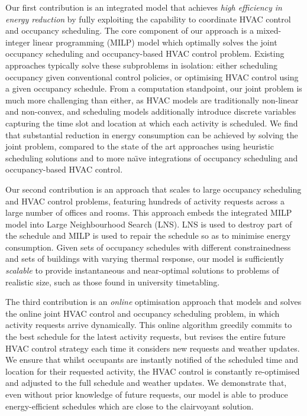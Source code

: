 Our first contribution is an integrated model that achieves \textsl{high efficiency in energy reduction} by fully exploiting the capability to coordinate HVAC control and occupancy scheduling. The core component of our approach is a mixed-integer linear programming (MILP) model which optimally solves the joint occupancy scheduling and occupancy-based HVAC control problem. Existing approaches typically solve these subproblems in isolation: either scheduling occupancy given conventional control policies, or optimising HVAC control using a given occupancy schedule. From a computation standpoint, our joint problem is much more challenging than either, as HVAC models are traditionally non-linear and non-convex, and scheduling models additionally introduce discrete variables capturing the time slot and location at which each activity is scheduled. We find that substantial reduction in energy consumption can be achieved by solving the joint problem, compared to the state of the art approaches using heuristic scheduling solutions and to more na\"{\i}ve integrations of occupancy scheduling and occupancy-based HVAC control.

Our second contribution is an approach that scales to large occupancy scheduling and HVAC control problems, featuring hundreds of activity requests across a large number of offices and rooms. This approach embeds the integrated MILP model into Large Neighbourhood Search (LNS). 
LNS is used to destroy part of the schedule and MILP is used to repair the schedule so as to minimise energy consumption. Given sets of occupancy schedules with different constrainedness and sets of buildings with varying thermal response, our model is sufficiently \textsl{scalable} to provide instantaneous and near-optimal solutions to problems of realistic size, such as those found in university timetabling.

The third contribution is an \textsl{online} optimisation approach that models and solves the online joint HVAC control and occupancy scheduling problem, in which activity requests arrive dynamically. This online algorithm greedily commits to the best schedule for the latest activity requests, but revises the entire future HVAC control strategy each time it considers new requests and weather updates. We ensure that whilst occupants are instantly notified of the scheduled time and location for their requested activity, the HVAC control is constantly re-optimised and adjusted to the full schedule and weather updates. We demonstrate that, even without prior knowledge of future requests, our model is able to produce energy-efficient schedules which are close to the clairvoyant solution. 

